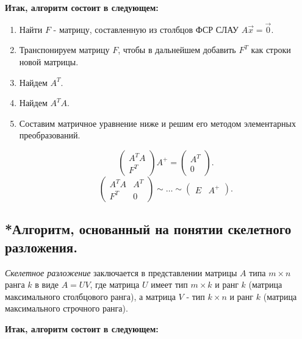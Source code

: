 \textbf{Итак, алгоритм состоит в следующем:}

\begin{enumerate}
    \item Найти $F$ - матрицу, составленную из столбцов ФСР СЛАУ $A\vec{x} = \vec{0}$.
    \item Транспонируем матрицу $F$, чтобы в дальнейшем добавить $F^T$ как строки новой матрицы.
    \item Найдем $A^T$.
    \item Найдем $A^TA$.
    \item Составим матричное уравнение ниже и решим его методом элементарных преобразований.

    \begin{equation*}
        \left(\begin{array}{c}
            A^TA \\
            F^T
        \end{array}\right)A^+
        =
        \left(\begin{array}{c}
            A^T \\
            0
        \end{array}\right)
    .\end{equation*}
    \begin{equation*}
        \left(\begin{array}{c|c}
            A^TA & A^T \\
            F^T & 0
        \end{array}\right)
        \sim \ldots \sim
        \left(\begin{array}{c|c}
            E & A^+
        \end{array}\right)
    .\end{equation*}
\end{enumerate}


\newpage

\subsection{
    *Алгоритм, основанный на понятии скелетного разложения.
}

\textit{Скелетное разложение} заключается в представлении матрицы $A$ типа $m \times n$ ранга $k$ в виде $A = UV$, где матрица $U$ имеет тип $m \times k$ и ранг $k$ (матрица максимального столбцового ранга), а матрица $V$ - тип $k \times n$ и ранг $k$ (матрица максимального строчного ранга).

\textbf{Итак, алгоритм состоит в следующем:}


